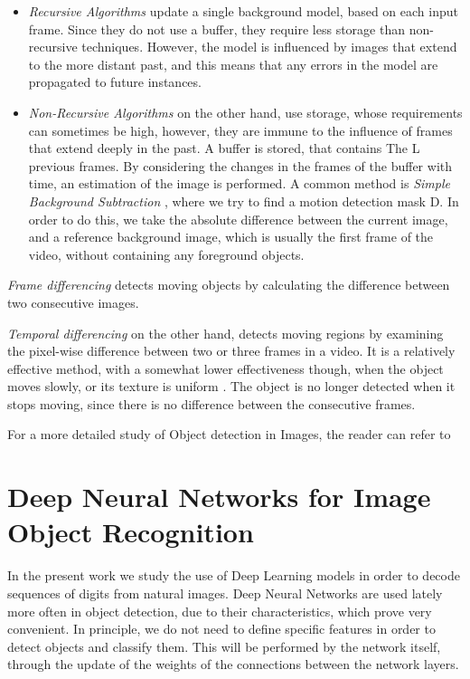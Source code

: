 \documentclass[final,12p,times]{elsarticle}
\begin{document}
\begin{itemize}
\item \emph{Recursive Algorithms} \cite{sen2004robust} \cite{srinivasan2009improved} update a single background model, based on each input frame. Since they do not use a buffer, 
they require less storage than non-recursive techniques. However, the model is influenced by images that extend to the more distant past, 
and this means that any errors in the model are propagated to future instances.

\item \emph{Non-Recursive Algorithms} \cite{sen2004robust} \cite{srinivasan2009improved} on the other hand, use storage, whose requirements can sometimes be high, however, 
they are immune to the influence of frames that extend deeply in the past.
A buffer is stored, that contains The L previous frames.
By considering the changes in the frames of the buffer with time, an estimation of the image is performed.
A common method is \emph{Simple Background Subtraction} \cite{rout2013survey} \cite{kim2002fast} \cite{zhan2007improved}, where we try to find a motion detection mask D.
In order to do this, we take the absolute difference between the current image, and a reference background image, which is usually the 
first frame of the video, without containing any foreground objects.
\end{itemize}

\emph{Frame differencing} \cite{rakibe2013background} detects moving objects by calculating the difference between two consecutive images.
 
\emph{Temporal differencing} \cite{joshi2012survey} on the other hand, detects moving regions by examining the pixel-wise difference between two or 
three frames in a video. It is a relatively effective method, with a somewhat lower effectiveness though, when the object moves slowly, 
or its texture is uniform \cite{paragios2000geodesic} \cite{zhu1996region}.  The object is no longer detected when it stops moving, since there is no difference between the 
consecutive frames.

For a more detailed study of Object detection in Images, the reader can refer to \cite{bushrasurvey}

\section{Deep Neural Networks for Image Object Recognition}
\label{sec:2}
In the present work we study the use of Deep Learning models in order to decode sequences of digits from natural images.
Deep Neural Networks are used lately more often in object detection, due to their characteristics, which prove very convenient.
In principle, we do not need to define specific features in order to detect objects and classify them.
This will be performed by the network itself, through the update of the weights of the connections between the network layers.
\end{document}
